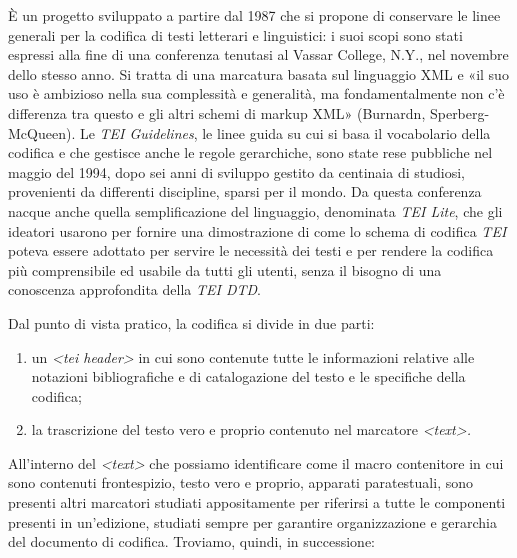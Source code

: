 \documentclass[
  b5paper,
  twoside,
  12pt,
  chapterprefix=false,
  bibliography=totocnumbered,
  parskip=false]{scrbook}
\begin{document}
È un progetto sviluppato a partire dal 1987 che si propone di conservare
le linee generali per la codifica di testi letterari e linguistici: i
suoi scopi sono stati espressi alla fine di una conferenza tenutasi al
Vassar College, N.Y., nel novembre dello stesso anno. Si tratta di una
marcatura basata sul linguaggio XML e «il suo uso è ambizioso nella sua
complessità e generalità, ma fondamentalmente non c'è differenza tra
questo e gli altri schemi di markup XML» (Burnardn, Sperberg-McQueen).
Le \emph{TEI Guidelines}, le linee guida su cui si basa il vocabolario della
codifica e che gestisce anche le regole gerarchiche, sono state rese
pubbliche nel maggio del 1994, dopo sei anni di sviluppo gestito da
centinaia di studiosi, provenienti da differenti discipline, sparsi per
il mondo. Da questa conferenza nacque anche quella semplificazione del
linguaggio, denominata \emph{TEI Lite}, che gli ideatori usarono per fornire
una dimostrazione di come lo schema di codifica \emph{TEI} poteva essere
adottato per servire le necessità dei testi e per rendere la codifica
più comprensibile ed usabile da tutti gli utenti, senza il bisogno di
una conoscenza approfondita della \emph{TEI DTD}.

Dal punto di vista pratico, la codifica si divide in due parti:

\begin{enumerate}
\def\labelenumi{\arabic{enumi}.}
\item
  un \emph{\textless tei header\textgreater{}} in cui sono contenute tutte le informazioni
  relative alle notazioni bibliografiche e di catalogazione del testo
  e le specifiche della codifica;
\item
  la trascrizione del testo vero e proprio contenuto nel marcatore
  \emph{\textless text\textgreater.}
\end{enumerate}

All'interno del \emph{\textless text\textgreater{}} che possiamo identificare come il macro
contenitore in cui sono contenuti frontespizio, testo vero e proprio,
apparati paratestuali, sono presenti altri marcatori studiati
appositamente per riferirsi a tutte le componenti presenti in
un'edizione, studiati sempre per garantire organizzazione e gerarchia
del documento di codifica. Troviamo, quindi, in successione:
\end{document}
